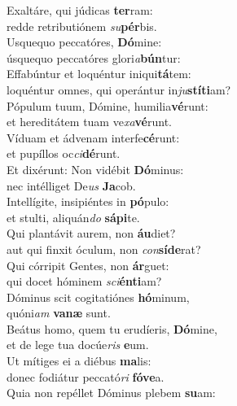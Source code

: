 \evenverse Exaltáre, qui júdicas \textbf{ter}ram:~\*\\
\evenverse redde retributiónem \textit{su}\textbf{pér}bis.\\
\oddverse Usquequo peccatóres, \textbf{Dó}mine:~\*\\
\oddverse úsquequo peccatóres glori\textit{a}\textbf{bún}tur:\\
\evenverse Effabúntur et loquéntur iniqui\textbf{tá}tem:~\*\\
\evenverse loquéntur omnes, qui operántur in\textit{ju}\textbf{stí}\textbf{ti}am?\\
\oddverse Pópulum tuum, Dómine, humilia\textbf{vé}runt:~\*\\
\oddverse et hereditátem tuam ve\textit{xa}\textbf{vé}runt.\\
\evenverse Víduam et ádvenam interfe\textbf{cé}runt:~\*\\
\evenverse et pupíllos oc\textit{ci}\textbf{dé}runt.\\
\oddverse Et dixérunt: Non vidébit \textbf{Dó}minus:~\*\\
\oddverse nec intélliget De\textit{us} \textbf{Ja}cob.\\
\evenverse Intellígite, insipiéntes in \textbf{pó}pulo:~\*\\
\evenverse et stulti, aliquán\textit{do} \textbf{sá}\textbf{pi}te.\\
\oddverse Qui plantávit aurem, non \textbf{áu}diet?~\*\\
\oddverse aut qui finxit óculum, non \textit{con}\textbf{sí}\textbf{de}rat?\\
\evenverse Qui córripit Gentes, non \textbf{ár}guet:~\*\\
\evenverse qui docet hóminem \textit{sci}\textbf{én}\textbf{ti}am?\\
\oddverse Dóminus scit cogitatiónes \textbf{hó}minum,~\*\\
\oddverse quóni\textit{am} \textbf{va}\textbf{næ} sunt.\\
\evenverse Beátus homo, quem tu erudíeris, \textbf{Dó}mine,~\*\\
\evenverse et de lege tua docúe\textit{ris} \textbf{e}um.\\
\oddverse Ut mítiges ei a diébus \textbf{ma}lis:~\*\\
\oddverse donec fodiátur peccató\textit{ri} \textbf{fó}\textbf{ve}a.\\
\evenverse Quia non repéllet Dóminus plebem \textbf{su}am:~\*\\

